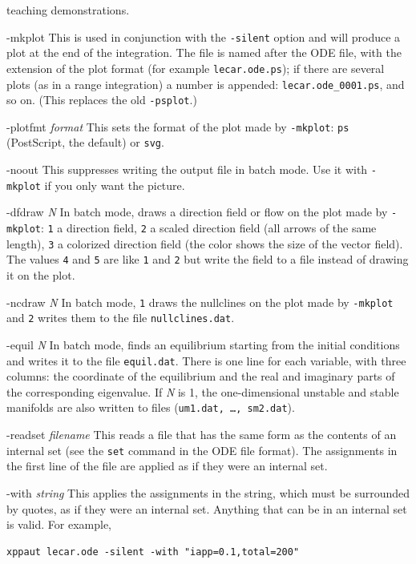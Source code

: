 \begin{description}
teaching demonstrations.
\item{-mkplot} This is used in conjunction with the {\tt -silent} option and will produce a plot at the end of the
integration.  The file is named after the ODE file, with the extension of the plot format (for example {\tt lecar.ode.ps}); if
there are several plots (as in a range integration) a number is appended: {\tt lecar.ode\_0001.ps}, and so on.  (This replaces the old {\tt -psplot}.)
\item{-plotfmt \emph{format}} This sets the format of the plot made by {\tt -mkplot}: {\tt ps} (PostScript, the default) or {\tt svg}.
\item{-noout} This suppresses writing the output file in batch mode.  Use it with {\tt -mkplot} if you only want the picture.
\item{-dfdraw \emph{N}} In batch mode, draws a direction field or flow on the plot made by {\tt -mkplot}: {\tt 1} a direction field,
{\tt 2} a scaled direction field (all arrows of the same length), {\tt 3} a colorized direction field (the color shows the size of the vector field).  The values {\tt 4} and {\tt 5} are like {\tt 1} and {\tt 2} but
write the field to a file instead of drawing it on the plot.
\item{-ncdraw \emph{N}} In batch mode, {\tt 1} draws the nullclines on the plot made by {\tt -mkplot} and {\tt 2} writes them to the file {\tt nullclines.dat}.
\item{-equil \emph{N}} In batch mode, finds an equilibrium starting from the initial conditions and writes it to the file {\tt equil.dat}.  There is one
line for each variable, with three columns: the coordinate of the equilibrium and the real and imaginary parts of the corresponding eigenvalue.
If {\emph N} is 1, the one-dimensional unstable and stable manifolds are also written to files ({\tt um1.dat, \ldots, sm2.dat}).
\item{-readset \emph{filename}} This reads a file that has the same form as the contents of an internal set (see the {\tt set} command
in the ODE file format).  The assignments in the first line of the file are applied as if they were an internal set.
\item{-with \emph{string}} This applies the assignments in the string, which must be surrounded by quotes, as if they were an internal set.
Anything that can be in an internal set is valid.  For example,
\begin{verbatim}
xppaut lecar.ode -silent -with "iapp=0.1,total=200"
\end{verbatim}

\end{description}
